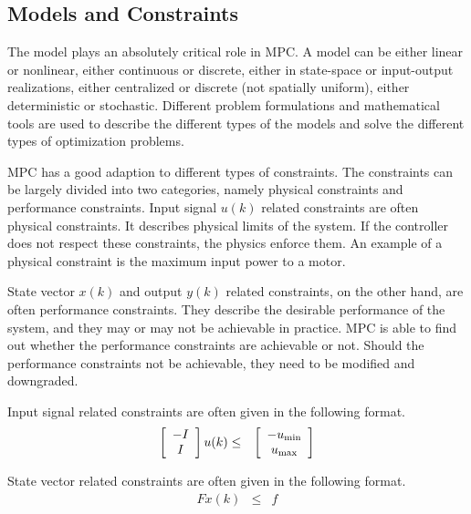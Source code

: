 \subsection{Models and Constraints}

The model plays an absolutely critical role in MPC. A model can be either linear or nonlinear, either continuous or discrete, either in state-space or input-output realizations, either centralized or discrete (not spatially uniform), either deterministic or stochastic. Different problem formulations and mathematical tools are used to describe the different types of the models and solve the different types of optimization problems.

MPC has a good adaption to different types of constraints. The constraints can be largely divided into two categories, namely physical constraints and performance constraints. Input signal $u(k)$ related constraints are often physical constraints. It describes physical limits of the system. If the controller does not respect these constraints, the physics enforce them. An example of a physical constraint is the maximum input power to a motor.

State vector $x(k)$ and output $y(k)$ related constraints, on the other hand, are often performance constraints. They describe the desirable performance of the system, and they may or may not be achievable in practice. MPC is able to find out whether the performance constraints are achievable or not. Should the performance constraints not be achievable, they need to be modified and downgraded.

Input signal related constraints are often given in the following format.
\begin{eqnarray}
	\left[\begin{array}{c}
		-I \\ I
	\end{array}\right]u(k) &\leq& \left[\begin{array}{c}
	-u_{\textup{min}} \\ u_{\textup{max}}
\end{array}\right] \nonumber
\end{eqnarray}

State vector related constraints are often given in the following format.
\begin{eqnarray}
	Fx(k) &\leq& f \nonumber
\end{eqnarray}

